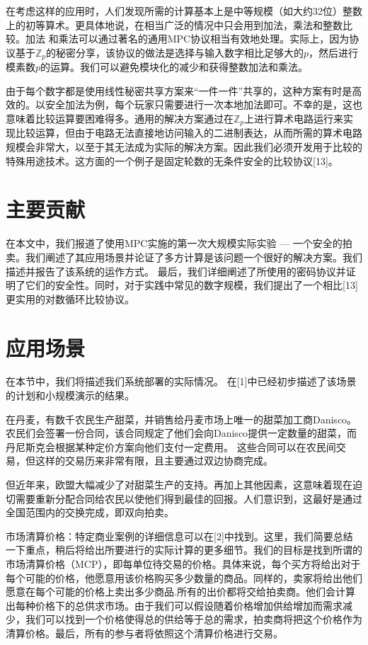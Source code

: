 在考虑这样的应用时，人们发现所需的计算基本上是中等规模（如大约32位）整数上的初等算术。更具体地说，在相当广泛的情况中只会用到加法，乘法和整数比较。加法
和乘法可以通过著名的通用MPC协议相当有效地处理。实际上，因为协议基于$\mathbb{Z}_p$的秘密分享，该协议的做法是选择与输入数字相比足够大的$p$，然后进行模素数$p$的运算。我们可以避免模块化的减少和获得整数加法和乘法。

由于每个数字都是使用线性秘密共享方案来“一件一件”共享的，这种方案有时是高效的。以安全加法为例，每个玩家只需要进行一次本地加法即可。不幸的是，这也意味着比较运算要困难得多。通用的解决方案通过在$\mathbb{Z}_p$上进行算术电路运行来实现比较运算，但由于电路无法直接地访问输入的二进制表达，从而所需的算术电路规模会非常大，以至于其无法成为实际的解决方案。因此我们必须开发用于比较的特殊用途技术。这方面的一个例子是固定轮数的无条件安全的比较协议[13]。

\section{主要贡献}
在本文中，我们报道了使用MPC实施的第一次大规模实际实验 --- 一个安全的拍卖。我们阐述了其应用场景并论证了多方计算是该问题一个很好的解决方案。我们描述并报告了该系统的运作方式。 最后，我们详细阐述了所使用的密码协议并证明了它们的安全性。同时，对于实践中常见的数字规模，我们提出了一个相比[13]更实用的对数循环比较协议。

\section{应用场景}
在本节中，我们将描述我们系统部署的实际情况。 在[1]中已经初步描述了该场景的计划和小规模演示的结果。

在丹麦，有数千农民生产甜菜，并销售给丹麦市场上唯一的甜菜加工商Danisco。农民们会签署一份合同，该合同规定了他们会向Danisco提供一定数量的甜菜，而丹尼斯克会根据某种定价方案向他们支付一定费用。 这些合同可以在农民间交易，但这样的交易历来非常有限，且主要通过双边协商完成。

但近年来，欧盟大幅减少了对甜菜生产的支持。再加上其他因素，这意味着现在迫切需要重新分配合同给农民以使他们得到最佳的回报。人们意识到，这最好是通过全国范围内的交换完成，即双向拍卖。

{\heiti 市场清算价格}：特定商业案例的详细信息可以在[2]中找到。这里，我们简要总结一下重点，稍后将给出所要进行的实际计算的更多细节。我们的目标是找到所谓的市场清算价格（MCP），即每单位待交易的价格。具体来说，每个买方将给出对于每个可能的价格，他愿意用该价格购买多少数量的商品。同样的，卖家将给出他们愿意在每个可能的价格上卖出多少商品.所有的出价都将交给拍卖商。他们会计算出每种价格下的总供求市场。由于我们可以假设随着价格增加供给增加而需求减少，我们可以找到一个价格使得总的供给等于总的需求，拍卖商将把这个价格作为清算价格。最后，所有的参与者将依照这个清算价格进行交易。

